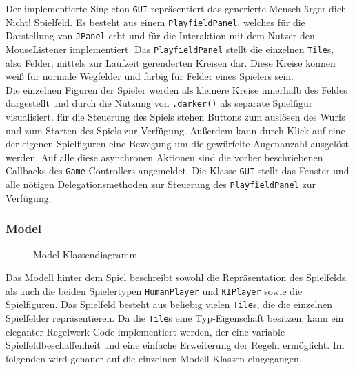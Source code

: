 \documentclass[conference]{IEEEtran}
\begin{document}
Der implementierte Singleton \texttt{GUI} repr\"asentiert das generierte Mensch \"arger dich Nicht! Spielfeld. Es besteht aus einem \texttt{PlayfieldPanel}, welches f\"ur die Darstellung von \texttt{JPanel} erbt und f\"ur die Interaktion mit dem Nutzer den MouseListener implementiert. Das \texttt{PlayfieldPanel} stellt die einzelnen \texttt{Tile}s, also Felder, mittels zur Laufzeit gerenderten Kreisen dar. Diese Kreise k\"onnen wei{\ss} f\"ur normale Wegfelder und farbig f\"ur Felder eines Spielers sein. \\
  Die einzelnen Figuren der Spieler werden als kleinere Kreise innerhalb des Feldes dargestellt und durch die Nutzung von \texttt{.darker()} als separate Spielfigur visualisiert. f\"ur die Steuerung des Spiels stehen Buttons zum ausl\"osen des Wurfs und zum Starten des Spiels zur Verf\"ugung. Au{\ss}erdem kann durch Klick auf eine der eigenen Spielfiguren eine Bewegung um die gew\"urfelte Augenanzahl ausgel\"ost werden. Auf alle diese asynchronen Aktionen sind die vorher beschriebenen Callbacks des \texttt{Game}-Controllers angemeldet. Die Klasse \texttt{GUI} stellt das Fenster und alle n\"otigen Delegationsmethoden zur Steuerung des \texttt{PlayfieldPanel} zur Verf\"ugung. \\

\subsubsection{Model}
\begin{figure}[]
    \centering
    \caption{Model Klassendiagramm}
\end{figure}

Das Modell hinter dem Spiel beschreibt sowohl die Repr\"asentation des Spielfelds, als auch die beiden Spielertypen \texttt{HumanPlayer} und \texttt{KIPlayer} sowie die Spielfiguren. Das Spielfeld besteht aus beliebig vielen \texttt{Tile}s, die die einzelnen Spielfelder repr\"asentieren. Da die \texttt{Tile}s eine Typ-Eigenschaft besitzen, kann ein eleganter Regelwerk-Code implementiert werden, der eine variable Spielfeldbeschaffenheit und eine einfache Erweiterung der Regeln erm\"oglicht.
Im folgenden wird genauer auf die einzelnen Modell-Klassen eingegangen.\\
\end{document}
